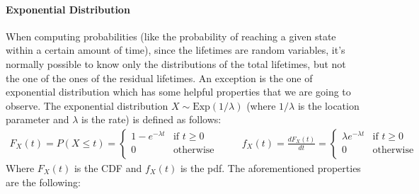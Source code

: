 \documentclass[12pt,a4paper]{article}
\begin{document}
\paragraph{Exponential Distribution}
When computing probabilities (like the probability of reaching a given state within a certain amount of time), since the lifetimes are random variables, it’s normally possible to know only the distributions of the total lifetimes, but not the one of the ones of the residual lifetimes. An exception is the one of exponential distribution which has some helpful properties that we are going to observe. The exponential distribution $X \sim \text{Exp}(1/\lambda)$ (where $1/\lambda$ is the location parameter and $\lambda$ is the rate) is defined as follows:
$$
\begin{matrix}
F_X(t)=P\left(X\leq t\right)=
\begin{cases}
1-e^{-\lambda t} & \textrm{if } t\geq 0 \\
0 & \textrm{otherwise} \\
\end{cases}
&&&
f_X(t)=\frac{dF_X(t)}{dt}=
\begin{cases}
\lambda e^{-\lambda t} & \textrm{if } t\geq 0 \\
0 & \textrm{otherwise} \\
\end{cases}
\end{matrix}
$$
Where $F_X(t)$ is the CDF and $f_X(t)$ is the pdf. The aforementioned properties are the following:
\end{document}
